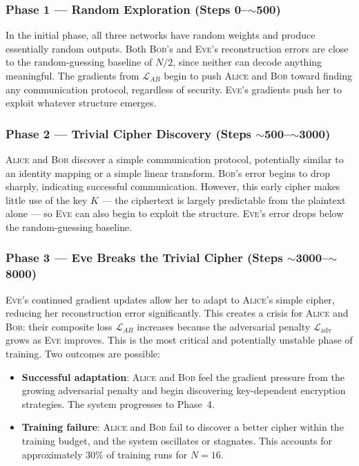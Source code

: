\documentclass[12pt, a4paper]{article}
\newcommand{\alice}{\textsc{Alice}}
\newcommand{\bob}{\textsc{Bob}}
\newcommand{\eve}{\textsc{Eve}}
\begin{document}
\subsubsection*{Phase 1 --- Random Exploration (Steps 0--$\sim$500)}

In the initial phase, all three networks have random weights and produce
essentially random outputs. Both \bob{}'s and \eve{}'s reconstruction
errors are close to the random-guessing baseline of $N/2$, since neither
can decode anything meaningful. The gradients from $\mathcal{L}_{AB}$
begin to push \alice{} and \bob{} toward finding any communication
protocol, regardless of security. \eve{}'s gradients push her to exploit
whatever structure emerges.

\subsubsection*{Phase 2 --- Trivial Cipher Discovery (Steps $\sim$500--$\sim$3000)}

\alice{} and \bob{} discover a simple communication protocol, potentially
similar to an identity mapping or a simple linear transform. \bob{}'s
error begins to drop sharply, indicating successful communication. However,
this early cipher makes little use of the key $K$ --- the ciphertext is
largely predictable from the plaintext alone --- so \eve{} can also
begin to exploit the structure. \eve{}'s error drops below the
random-guessing baseline.

\subsubsection*{Phase 3 --- Eve Breaks the Trivial Cipher (Steps $\sim$3000--$\sim$8000)}

\eve{}'s continued gradient updates allow her to adapt to \alice{}'s
simple cipher, reducing her reconstruction error significantly. This
creates a crisis for \alice{} and \bob{}: their composite loss
$\mathcal{L}_{AB}$ increases because the adversarial penalty
$\mathcal{L}_{\mathrm{adv}}$ grows as \eve{} improves. This is the
most critical and potentially unstable phase of training. Two outcomes
are possible:

\begin{itemize}[leftmargin=1.8em, itemsep=4pt]
  \item \textbf{Successful adaptation}: \alice{} and \bob{} feel the
        gradient pressure from the growing adversarial penalty and begin
        discovering key-dependent encryption strategies. The system
        progresses to Phase~4.
  \item \textbf{Training failure}: \alice{} and \bob{} fail to discover
        a better cipher within the training budget, and the system
        oscillates or stagnates. This accounts for approximately 30\%
        of training runs for $N=16$.
\end{itemize}
\end{document}
